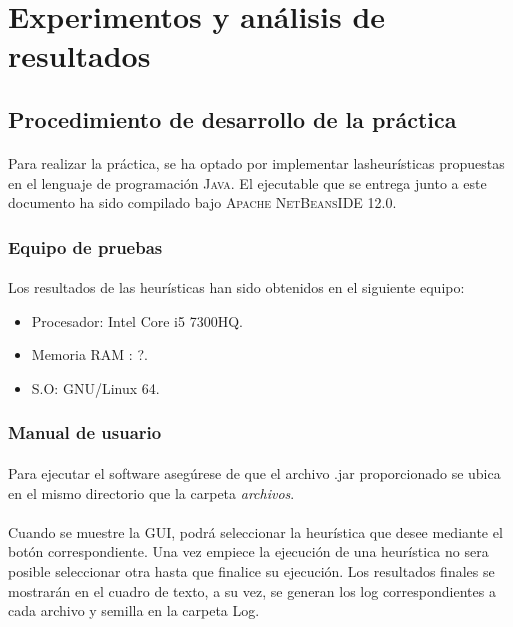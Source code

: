 \documentclass{article}
\begin{document}
	\section{Experimentos y análisis de resultados}
	
	\subsection{Procedimiento de desarrollo de la práctica}
	
	\paragraph{}Para realizar la práctica, se ha optado por implementar lasheurísticas propuestas en el lenguaje de programación \textsc{Java}. El ejecutable que se entrega junto a este documento ha sido compilado bajo \textsc{ Apache NetBeansIDE 12.0}.
	
	\subsubsection{Equipo de pruebas}
	
	\paragraph{}Los resultados de las heurísticas han sido obtenidos en el siguiente equipo:
	
		\begin{itemize}
			
			\item Procesador: Intel Core i5 7300HQ.
			\item Memoria RAM : ?.
			\item S.O: GNU/Linux 64.
			
		\end{itemize}

	\subsubsection{Manual de usuario}
	
		\paragraph{}Para ejecutar el software asegúrese de que el archivo .jar proporcionado se ubica en el mismo directorio que la carpeta \emph{archivos}. 
		
		\paragraph{}Cuando se muestre la GUI, podrá seleccionar la heurística que desee mediante el botón correspondiente. Una vez empiece la ejecución de una heurística no sera posible seleccionar otra hasta que finalice su ejecución. Los resultados finales se mostrarán en el cuadro de texto, a su vez, se generan los log correspondientes a cada archivo y semilla en la carpeta Log.
	
\end{document}
